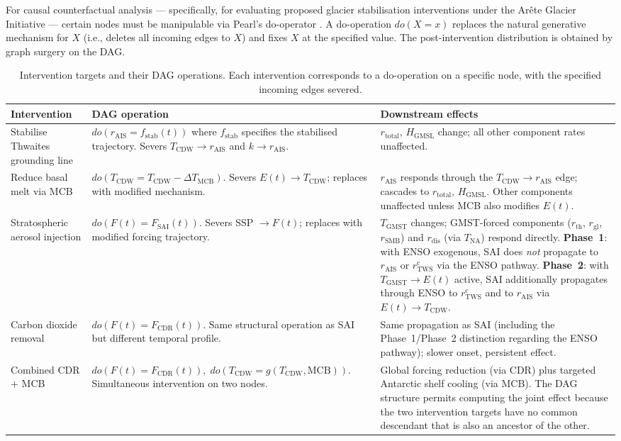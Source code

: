 \documentclass[11pt]{article}
\newcommand{\GMSL}{\text{GMSL}}
\newcommand{\GMST}{\text{GMST}}
\newcommand{\CDW}{\text{CDW}}
\begin{document}
For causal counterfactual analysis --- specifically, for evaluating proposed glacier stabilisation interventions under the Ar\^ete Glacier Initiative --- certain nodes must be manipulable via Pearl's do-operator \citep{pearl2009causality}.  A do-operation $do(X = x)$ replaces the natural generative mechanism for $X$ (i.e., deletes all incoming edges to $X$) and fixes $X$ at the specified value.  The post-intervention distribution is obtained by graph surgery on the DAG.

\begin{table}[ht]
\centering
\caption{Intervention targets and their DAG operations.  Each intervention corresponds to a do-operation on a specific node, with the specified incoming edges severed.}
\label{tab:interventions}
\small
\begin{tabular}{p{3.2cm}p{4.5cm}p{5.5cm}}
\toprule
Intervention & DAG operation & Downstream effects \\
\midrule
Stabilise Thwaites grounding line & $do(r_{\text{AIS}} = f_{\text{stab}}(t))$ where $f_{\text{stab}}$ specifies the stabilised trajectory.  Severs $T_{\CDW} \to r_{\text{AIS}}$ and $k \to r_{\text{AIS}}$. & $r_{\text{total}}$, $H_{\GMSL}$ change; all other component rates unaffected. \\
\addlinespace
Reduce basal melt via MCB & $do(T_{\CDW} = T_{\CDW} - \Delta T_{\text{MCB}})$.  Severs $E(t) \to T_{\CDW}$; replaces with modified mechanism. & $r_{\text{AIS}}$ responds through the $T_{\CDW} \to r_{\text{AIS}}$ edge; cascades to $r_{\text{total}}$, $H_{\GMSL}$.  Other components unaffected unless MCB also modifies $E(t)$. \\
\addlinespace
Stratospheric aerosol injection & $do(F(t) = F_{\text{SAI}}(t))$.  Severs SSP $\to F(t)$; replaces with modified forcing trajectory. & $T_{\GMST}$ changes; GMST-forced components ($r_{\text{th}}$, $r_{\text{gl}}$, $r_{\text{SMB}}$) and $r_{\text{dis}}$ (via $T_{\text{NA}}$) respond directly.  \textbf{Phase~1}: with ENSO exogenous, SAI does \emph{not} propagate to $r_{\text{AIS}}$ or $r_{\text{TWS}}^{\text{c}}$ via the ENSO pathway.  \textbf{Phase~2}: with $T_{\GMST} \to E(t)$ active, SAI additionally propagates through ENSO to $r_{\text{TWS}}^{\text{c}}$ and to $r_{\text{AIS}}$ via $E(t) \to T_{\CDW}$. \\
\addlinespace
Carbon dioxide removal & $do(F(t) = F_{\text{CDR}}(t))$.  Same structural operation as SAI but different temporal profile. & Same propagation as SAI (including the Phase~1/Phase~2 distinction regarding the ENSO pathway); slower onset, persistent effect. \\
\addlinespace
Combined CDR + MCB & $do(F(t) = F_{\text{CDR}}(t)),\; do(T_{\CDW} = g(T_{\CDW}, \text{MCB}))$.  Simultaneous intervention on two nodes. & Global forcing reduction (via CDR) plus targeted Antarctic shelf cooling (via MCB).  The DAG structure permits computing the joint effect because the two intervention targets have no common descendant that is also an ancestor of the other. \\
\bottomrule
\end{tabular}
\end{table}
\end{document}
